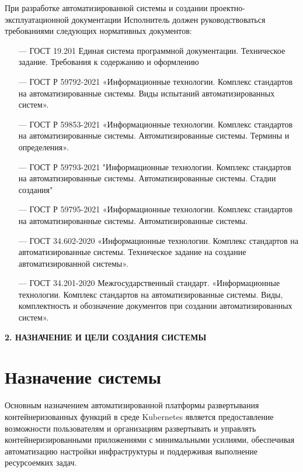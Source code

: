 При разработке автоматизированной системы и создании проектно-
эксплуатационной документации Исполнитель должен руководствоваться
требованиями следующих нормативных документов:
\begin{itemize}
    \item[---]ГОСТ 19.201 Единая система программной документации. Техническое задание. Требования к содержанию и оформлению

    \item[---]ГОСТ Р 59792-2021 «Информационные технологии. Комплекс стандартов на автоматизированные системы. Виды испытаний автоматизированных систем».
    
    \item[---]ГОСТ Р 59853-2021 «Информационные технологии. Комплекс стандартов на автоматизированные системы. Автоматизированные системы. Термины и определения».
    
    \item[---]ГОСТ Р 59793-2021 "Информационные технологии. Комплекс стандартов на автоматизированные системы. Автоматизированные системы. Стадии создания"
    
    \item[---]ГОСТ Р 59795-2021 «Информационные технологии. Комплекс стандартов на автоматизированные системы. Автоматизированные системы.
    
    \item[---]ГОСТ 34.602-2020 «Информационные технологии. Комплекс стандартов на автоматизированные системы. Техническое задание на создание автоматизированной системы».
    
    \item[---]ГОСТ 34.201-2020 Межгосударственный стандарт. «Информационные технологии. Комплекс стандартов на автоматизированные системы. Виды, комплектность и обозначение документов при создании автоматизированных систем».
\end{itemize}

\newpage
\begin{center}
  \textbf{\large 2. НАЗНАЧЕНИЕ И ЦЕЛИ СОЗДАНИЯ СИСТЕМЫ}
\end{center}

\section{Назначение системы}

Основным назначением автоматизированной платформы развертывания контейнеризованных функций в среде Kubernetes является предоставление возможности пользователям и организациям развертывать и управлять контейнеризированными приложениями с минимальными усилиями, обеспечивая автоматизацию настройки инфраструктуры и поддерживая выполнение ресурсоемких задач.

